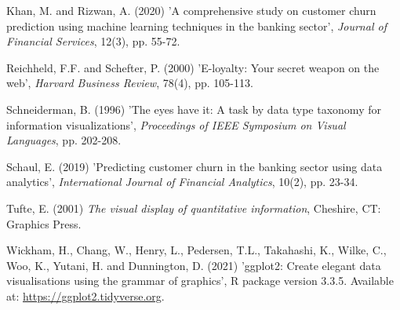 \documentclass[12pt]{article}
\begin{document}
\begin{thebibliography}{99}

  Khan, M. and Rizwan, A. (2020) 'A comprehensive study on customer churn prediction using machine learning techniques in the banking sector', \textit{Journal of Financial Services}, 12(3), pp. 55-72. 
  
  Reichheld, F.F. and Schefter, P. (2000) 'E-loyalty: Your secret weapon on the web', \textit{Harvard Business Review}, 78(4), pp. 105-113. 

  Schneiderman, B. (1996) 'The eyes have it: A task by data type taxonomy for information visualizations', \textit{Proceedings of IEEE Symposium on Visual Languages}, pp. 202-208.

  Schaul, E. (2019) 'Predicting customer churn in the banking sector using data analytics', \textit{International Journal of Financial Analytics}, 10(2), pp. 23-34.

  Tufte, E. (2001) \textit{The visual display of quantitative information}, Cheshire, CT: Graphics Press. 
  
  Wickham, H., Chang, W., Henry, L., Pedersen, T.L., Takahashi, K., Wilke, C., Woo, K., Yutani, H. and Dunnington, D. (2021) 'ggplot2: Create elegant data visualisations using the grammar of graphics', R package version 3.3.5. Available at: \url{https://ggplot2.tidyverse.org}.

\end{thebibliography}
\end{document}
